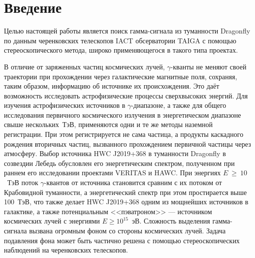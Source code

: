 \documentclass[magd,floatypics,numeref]{msudipl} %
\begin{document}
\author{Разумов Александр Юрьевич}
\maketitle


\tableofcontents   %

\chapter*{Введение}   %
Целью настоящей работы является поиск гамма-сигнала из туманности Dragonfly по данным черенковских телескопов IACT обсерватории TAIGA с помощью стереоскопического метода, широко применяющегося в такого типа проектах. 

В отличие от заряженных частиц космических лучей, $\gamma$-кванты не меняют своей траектории при прохождении через галактические магнитные поля, сохраняя, таким образом, информацию об источнике их происхождения. Это даёт возможность исследовать астрофизические процессы сверхвысоких энергий. Для изучения астрофизических источников в $\gamma$-диапазоне, а также для общего исследования первичного космического излучения в энергетическом диапазоне свыше нескольких~ТэВ, применяются одни и те же методы наземной регистрации. При этом регистрируется не сама частица, а продукты каскадного рождения вторичных частиц, вызванного прохождением первичной частицы через атмосферу. Выбор источника HWC J2019+368 в туманности Dragonfly в созвездии Лебедь обусловлен его энергетическим спектром, полученном при раннем его исследовании проектами VERITAS и HAWC. При энергиях $E~\geq~10$~ТэВ поток $\gamma$-квантов от источника становится сравним с их потоком от Крабовидной туманности, а энергетический спектр при этом простирается выше 100~ТэВ, что также делает HWC J2019+368 одним из мощнейших источников в галактике, а также потенциальным  <<пэватроном>> --- источником космических лучей с энергиями $E\geq10^{15}$~эВ. Сложность выделения гамма-сигнала вызвана огромным фоном со стороны космических лучей. Задача подавления фона может быть частично решена с помощью стереоскопических наблюдений на черенковских телескопов. 
\end{document}
